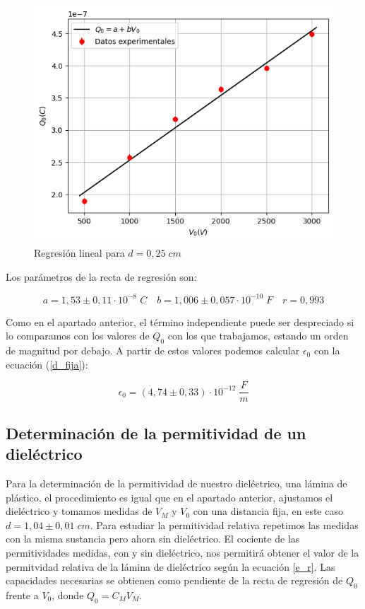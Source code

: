 \documentclass[a4paper,12pt,titlepage]{article}
\begin{document}
\begin{figure}[h!]
    \centering
    \includegraphics[width=0.65\linewidth]{d_fija.png}
    \caption{Regresión lineal para $d=0,25\;cm$}
    \label{fig:enter-label}
\end{figure}

Los parámetros de la recta de regresión son:

\begin{equation}
    a = 1,53 \pm 0,11 \cdot 10^{-8}\; C \quad b = 1,006 \pm 0,057 \cdot 10^{-10} \;F\quad r = 0,993
\end{equation}

Como en el apartado anterior, el término independiente puede ser despreciado si lo comparamos con los valores de $Q_0$ con los que trabajamos, estando un orden de magnitud por debajo. A partir de estos valores podemos calcular $\epsilon_0$ con la ecuación (\ref{d_fija}):

\begin{equation}
    \epsilon_0 = (4,74 \pm 0,33)\cdot 10^{-12} \; \frac{F}{m}
\end{equation}

\newpage

\subsection{Determinación de la permitividad de un dieléctrico}

Para la determinación de la permitividad de nuestro dieléctrico, una lámina de plástico, el procedimiento es igual que en el apartado anterior, ajustamos el dieléctrico y tomamos medidas de $V_M$ y $V_0$ con una distancia fija, en este caso $d=1,04 \pm 0,01 \;cm$. Para estudiar la permitividad relativa repetimos las medidas con la misma sustancia pero ahora sin dieléctrico. El cociente de las permitividades medidas, con y sin dieléctrico, nos permitirá obtener el valor de la permitvidad relativa de la lámina de dieléctrico según la ecuación \ref{e_r}. Las capacidades necesarias se obtienen como pendiente de la recta de regresión de $Q_0$ frente a $V_0$, donde $Q_0 = C_M V_M$.
\end{document}
